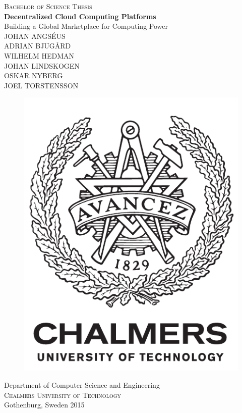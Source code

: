 \newpage
\restoregeometry
\thispagestyle{empty}
\mbox{}


\newpage
\thispagestyle{empty}
\begin{center}
	\textsc{\large Bachelor of Science Thesis}\\[4cm]
	\textbf{\large Decentralized Cloud Computing Platforms} \\[1cm]
	{\large Building a Global Marketplace for Computing Power}\\[1cm]
	{\large JOHAN ANGSÉUS\\
	        ADRIAN BJUGÅRD\\
	        WILHELM HEDMAN\\
	        JOHAN LINDSKOGEN\\
	        OSKAR NYBERG\\
	        JOEL TORSTENSSON\\}
	
	\vfill	
	\begin{figure}[h!]
	\centering
	\includegraphics[width=0.2\pdfpagewidth]{figure/auxiliary/logo_eng.pdf} \\	
	\end{figure}	\vspace{5mm}	
	
	Department of Computer Science and Engineering \\
	\textsc{Chalmers University of Technology} \\
	Gothenburg, Sweden 2015 \\
\end{center}


